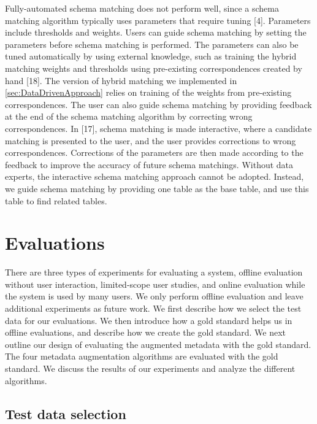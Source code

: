 Fully-automated schema matching does not perform well, since a schema matching algorithm typically uses parameters that require tuning \cite{books/sp/bellahsene11}[4]. Parameters include thresholds and weights. Users can guide schema matching by setting the parameters before schema matching is performed. The parameters can also be tuned automatically by using external knowledge, such as training the hybrid matching weights and thresholds using pre-existing correspondences created by hand \cite{Ehrig2004QOM}[18]. The version of hybrid matching we implemented in \autoref{sec:DataDrivenApproach} relies on training of the weights from pre-existing correspondences. The user can also guide schema matching by providing feedback at the end of the schema matching algorithm by correcting wrong correspondences. In \cite{Duchateau2009YAM}[17], schema matching is made interactive, where a candidate matching is presented to the user, and the user provides corrections to wrong correspondences. Corrections of the parameters are then made according to the feedback to improve the accuracy of future schema matchings.
Without data experts, the interactive schema matching approach cannot be adopted. Instead, we guide schema matching by providing one table as the base table, and use this table to find related tables.

\section{Evaluations}
\label{sec:Evaluations}

There are three types of experiments for evaluating a system, offline evaluation without user interaction, limited-scope user studies, and online evaluation while the system is used by many users. We only perform offline evaluation and leave additional experiments as future work. We first describe how we select the test data for our evaluations. We then introduce how a gold standard helps us in offline evaluations, and describe how we create the gold standard. We next outline our design of evaluating the augmented metadata with the gold standard. The four metadata augmentation algorithms are evaluated with the gold standard. We discuss the results of our experiments and analyze the different algorithms.

\subsection{Test data selection}
\label{ssec:TestDataSelection}

